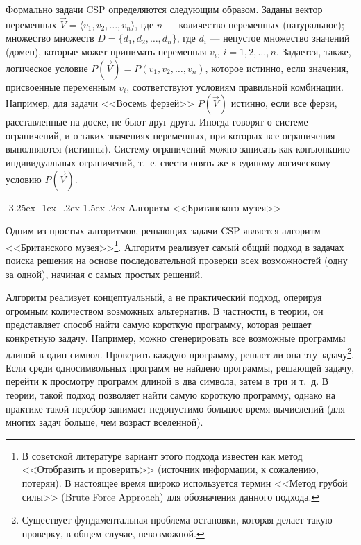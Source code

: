 \documentclass[12pt, openany, twoside]{book} %
\makeatletter
\renewcommand\section{\@startsection {section}{1}{\z@}%
                                   {-3.25ex \@plus -1ex \@minus -.2ex}%
                                   {1.5ex \@plus.2ex}%
                                   {\normalfont\large\bfseries}}
\makeatother
\begin{document}
Формально задачи CSP определяются следующим образом. Заданы вектор переменных $\vec{V}=\langle v_1, v_2, \ldots, v_n\rangle$, где $n$ --- количество переменных (натуральное); множество множеств $D=\{ d_1, d_2, \ldots, d_n\}$, где $d_i$ --- непустое множество значений (домен), которые может принимать переменная $v_i$, $i=1,2,\ldots,n$. Задается, также, логическое условие $P(\vec{V})=P(v_1,v_2,\ldots,v_n)$, которое истинно, если значения, присвоенные переменным $v_i$, соответствуют условиям правильной комбинации. Например, для задачи <<Восемь ферзей>> $P(\vec{V})$ истинно, если все ферзи, расставленные на доске, не бьют друг друга. Иногда говорят о системе ограничений, и о таких значениях переменных, при которых все ограничения выполняются (истинны). Систему ограничений можно записать как конъюнкцию индивидуальных ограничений, т.~е. свести опять же к единому логическому условию $P(\vec{V})$.

\section{Алгоритм <<Британского музея>>}

Одним из простых алгоритмов, решающих задачи CSP является алгоритм <<Британского музея>>\footnote{В советской литературе вариант этого подхода известен как метод <<Отобразить и проверить>> (источник информации, к сожалению, потерян). В настоящее время широко используется термин <<Метод грубой силы>> (Brute Force Approach) для обозначения данного подхода.}. Алгоритм реализует самый общий подход в задачах поиска решения на основе последовательной проверки всех возможностей (одну за одной), начиная с самых простых решений.

Алгоритм реализует концептуальный, а не практический подход, оперируя огромным количеством возможных альтернатив. В частности, в теории, он представляет способ найти самую короткую программу, которая решает конкретную задачу. Например, можно сгенерировать все возможные программы длиной в один символ. Проверить каждую программу, решает ли она эту задачу\footnote{Существует фундаментальная проблема остановки, которая делает такую проверку, в общем случае, невозможной.}. Если среди односимвольных программ не найдено программы, решающей задачу, перейти к просмотру программ длиной в два символа, затем в три и т.~д. В теории, такой подход позволяет найти самую короткую программу, однако на практике такой перебор занимает недопустимо большое время вычислений (для многих задач больше, чем возраст вселенной).
\end{document}
